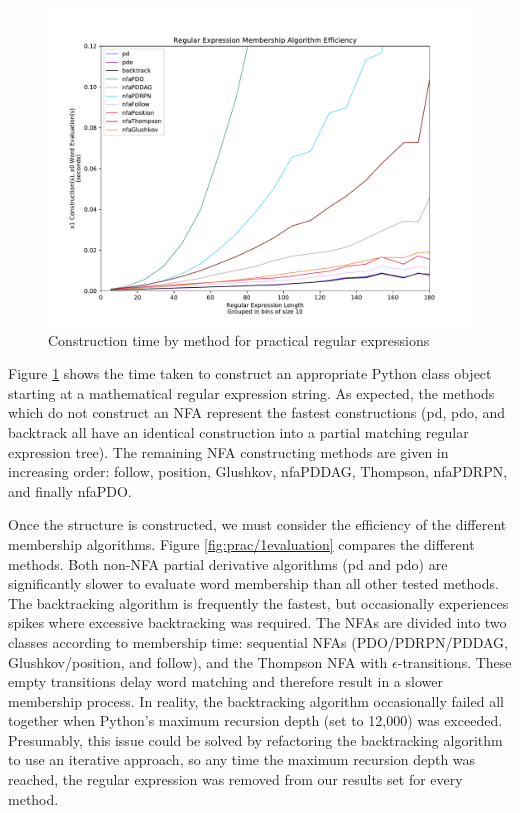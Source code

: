 \begin{figure}[H]
  \center
  \includegraphics[width=0.75\linewidth]{fig/prac/1construction}
  \caption{Construction time by method for practical regular expressions}
  \label{fig:prac/1construction}
\end{figure}

Figure \ref{fig:prac/1construction} shows the time taken to construct an appropriate Python class object starting at a mathematical regular expression string. As expected, the methods which do not construct an NFA represent the fastest constructions (pd, pdo, and backtrack all have an identical construction into a partial matching regular expression tree). The remaining NFA constructing methods are given in increasing order: follow, position, Glushkov, nfaPDDAG, Thompson, nfaPDRPN, and finally nfaPDO.

Once the structure is constructed, we must consider the efficiency of the different membership algorithms. Figure \ref{fig:prac/1evaluation} compares the different methods. Both non-NFA partial derivative algorithms (pd and pdo) are significantly slower to evaluate word membership than all other tested methods. The backtracking algorithm is frequently the fastest, but occasionally experiences spikes where excessive backtracking was required. The NFAs are divided into two classes according to membership time: sequential NFAs (PDO/PDRPN/PDDAG, Glushkov/position, and follow), and the Thompson NFA with $\epsilon$-transitions. These empty transitions delay word matching and therefore result in a slower membership process. In reality, the backtracking algorithm occasionally failed all together when Python's maximum recursion depth (set to 12,000) was exceeded. Presumably, this issue could be solved by refactoring the backtracking algorithm to use an iterative approach, so any time the maximum recursion depth was reached, the regular expression was removed from our results set for every method.


